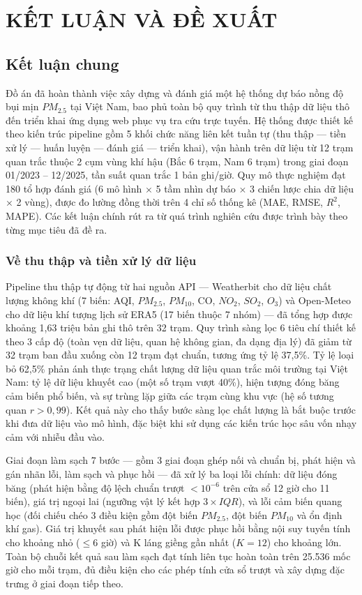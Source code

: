 \chapter{KẾT LUẬN VÀ ĐỀ XUẤT}

\section{Kết luận chung}

Đồ án đã hoàn thành việc xây dựng và đánh giá một hệ thống dự báo nồng độ bụi mịn $PM_{2.5}$ tại Việt Nam, bao phủ toàn bộ quy trình từ thu thập dữ liệu thô đến triển khai ứng dụng web phục vụ tra cứu trực tuyến. Hệ thống được thiết kế theo kiến trúc pipeline gồm 5 khối chức năng liên kết tuần tự (thu thập --- tiền xử lý --- huấn luyện --- đánh giá --- triển khai), vận hành trên dữ liệu từ 12 trạm quan trắc thuộc 2 cụm vùng khí hậu (Bắc 6 trạm, Nam 6 trạm) trong giai đoạn 01/2023 -- 12/2025, tần suất quan trắc 1 bản ghi/giờ. Quy mô thực nghiệm đạt 180 tổ hợp đánh giá (6 mô hình $\times$ 5 tầm nhìn dự báo $\times$ 3 chiến lược chia dữ liệu $\times$ 2 vùng), được đo lường đồng thời trên 4 chỉ số thống kê (MAE, RMSE, $R^2$, MAPE). Các kết luận chính rút ra từ quá trình nghiên cứu được trình bày theo từng mục tiêu đã đề ra.

\subsection{Về thu thập và tiền xử lý dữ liệu}

Pipeline thu thập tự động từ hai nguồn API --- Weatherbit cho dữ liệu chất lượng không khí (7 biến: AQI, $PM_{2.5}$, $PM_{10}$, CO, $NO_2$, $SO_2$, $O_3$) và Open-Meteo cho dữ liệu khí tượng lịch sử ERA5 (17 biến thuộc 7 nhóm) --- đã tổng hợp được khoảng 1,63 triệu bản ghi thô trên 32 trạm. Quy trình sàng lọc 6 tiêu chí thiết kế theo 3 cấp độ (toàn vẹn dữ liệu, quan hệ không gian, đa dạng địa lý) đã giảm từ 32 trạm ban đầu xuống còn 12 trạm đạt chuẩn, tương ứng tỷ lệ 37,5\%. Tỷ lệ loại bỏ 62,5\% phản ánh thực trạng chất lượng dữ liệu quan trắc môi trường tại Việt Nam: tỷ lệ dữ liệu khuyết cao (một số trạm vượt 40\%), hiện tượng đóng băng cảm biến phổ biến, và sự trùng lặp giữa các trạm cùng khu vực (hệ số tương quan $r > 0,99$). Kết quả này cho thấy bước sàng lọc chất lượng là bắt buộc trước khi đưa dữ liệu vào mô hình, đặc biệt khi sử dụng các kiến trúc học sâu vốn nhạy cảm với nhiễu đầu vào.

Giai đoạn làm sạch 7 bước --- gồm 3 giai đoạn ghép nối và chuẩn bị, phát hiện và gán nhãn lỗi, làm sạch và phục hồi --- đã xử lý ba loại lỗi chính: dữ liệu đóng băng (phát hiện bằng độ lệch chuẩn trượt $< 10^{-6}$ trên cửa sổ 12 giờ cho 11 biến), giá trị ngoại lai (ngưỡng vật lý kết hợp $3 \times IQR$), và lỗi cảm biến quang học (đối chiếu chéo 3 điều kiện gồm đột biến $PM_{2.5}$, đột biến $PM_{10}$ và ổn định khí gas). Giá trị khuyết sau phát hiện lỗi được phục hồi bằng nội suy tuyến tính cho khoảng nhỏ ($\le 6$ giờ) và K láng giềng gần nhất ($K = 12$) cho khoảng lớn. Toàn bộ chuỗi kết quả sau làm sạch đạt tính liên tục hoàn toàn trên 25.536 mốc giờ cho mỗi trạm, đủ điều kiện cho các phép tính cửa sổ trượt và xây dựng đặc trưng ở giai đoạn tiếp theo.

